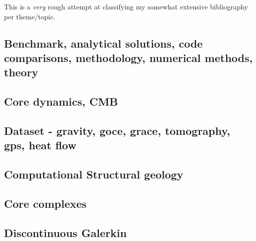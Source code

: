 This is a {\it very} rough attempt at classifying my somewhat extensive 
bibliography per theme/topic.
 


\subsection*{Benchmark, analytical solutions, code comparisons, methodology, numerical methods, theory}

\cite{yusa84}
\cite{trab90}
\cite{zhon96}
\cite{rist97}
\cite{lind99}
\cite{taki03}
\cite{toma07}
\cite{zhmt08}\cite{deka08}\cite{trub08}
\cite{dumg11}\cite{uibb11}
\cite{thmk14}
\cite{lelk15}\cite{rumi15}
\cite{dumy16}
\cite{robh17}\cite{wisv17}
\cite{clhe19}

\subsection*{Core dynamics, CMB}

\cite{hayu96}
\cite{lahb08}

\subsection*{Dataset - gravity, goce, grace, tomography, gps, heat flow}

\cite{dzan81}
\cite{krhh03}
\cite{hawj12}\cite{resa12}\cite{hawj12}
\cite{ress13}\cite{ebbf13}\cite{davi13}
\cite{paml14}\cite{ebbf14}\cite{krbk14}
\cite{boem15}

\subsection*{Computational Structural geology}

\cite{acgf00}
\cite{trla00}

\subsection*{Core complexes}

\cite{lehm12}

\subsection*{Discontinuous Galerkin}

